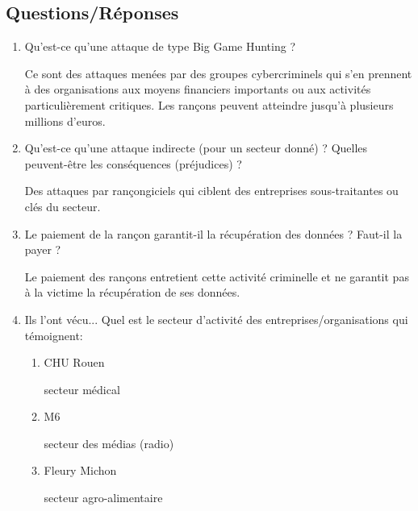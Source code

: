 \documentclass[a4paper]{article}
\begin{document}
\subsection{Questions/Réponses}





\begin{enumerate}



\item Qu'est-ce qu'une attaque de type Big Game Hunting ?
\begin{example}
    Ce sont des attaques menées par des groupes cybercriminels qui s’en prennent à des organisations aux moyens financiers importants ou aux activités particulièrement critiques. Les rançons peuvent atteindre jusqu’à plusieurs millions d'euros.
\end{example}



\item Qu'est-ce qu'une attaque indirecte (pour un secteur donné) ? Quelles peuvent-être les conséquences (préjudices) ?
\begin{example}
    Des attaques par rançongiciels qui ciblent des entreprises sous-traitantes ou clés du secteur.
\end{example}



\item Le paiement de la rançon garantit-il la récupération des données ? Faut-il la payer ?
\begin{example}
    Le paiement des rançons entretient cette activité criminelle et ne garantit pas à la victime la récupération de ses données.
\end{example}



\item Ils l'ont vécu... Quel est le secteur d'activité des entreprises/organisations qui témoignent:
\begin{enumerate}
    \item CHU Rouen
    \begin{example}
        secteur médical
    \end{example}
    \item M6
    \begin{example}
        secteur des médias (radio)
    \end{example}
    \item Fleury Michon
    \begin{example}
        secteur agro-alimentaire
    \end{example}
\end{enumerate}




\end{enumerate}
\end{document}
